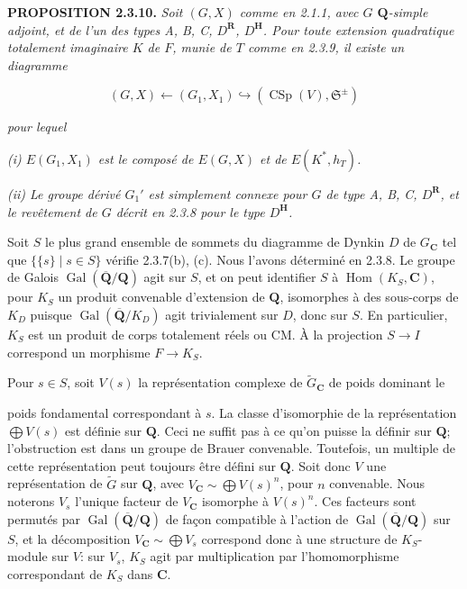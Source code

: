 \documentclass[10pt,a4paper]{article}
\newcommand{\SourcePage}[2]{\clearpage\setcounter{page}{#2}\typeout{D031_SOURCE_PAGE physical=#1 printed=#2}}
\begin{document}
\textbf{PROPOSITION 2.3.10.} \emph{Soit \((G,X)\) comme en 2.1.1, avec \(G\) \(\mathbf Q\)-simple adjoint, et de l'un des types A, B, C, \(D^{\mathbf R}\), \(D^{\mathbf H}\). Pour toute extension quadratique totalement imaginaire \(K\) de \(F\), munie de \(T\) comme en 2.3.9, il existe un diagramme}

\[
(G,X)\longleftarrow(G_1,X_1)\hookrightarrow(\operatorname{CSp}(V),\mathfrak S^{\pm})
\]

\emph{pour lequel}

\emph{(i) \(E(G_1,X_1)\) est le composé de \(E(G,X)\) et de \(E(K^*,h_T)\).}

\emph{(ii) Le groupe dérivé \(G_1'\) est simplement connexe pour \(G\) de type A, B, C, \(D^{\mathbf R}\), et le revêtement de \(G\) décrit en 2.3.8 pour le type \(D^{\mathbf H}\).}

Soit \(S\) le plus grand ensemble de sommets du diagramme de Dynkin \(D\) de \(G_{\mathbf C}\) tel que \(\{\{s\}\mid s\in S\}\) vérifie 2.3.7(b), (c). Nous l'avons déterminé en 2.3.8. Le groupe de Galois \(\operatorname{Gal}(\overline{\mathbf Q}/\mathbf Q)\) agit sur \(S\), et on peut identifier \(S\) à \(\operatorname{Hom}(K_S,\mathbf C)\), pour \(K_S\) un produit convenable d'extension de \(\mathbf Q\), isomorphes à des sous-corps de \(K_D\) puisque \(\operatorname{Gal}(\overline{\mathbf Q}/K_D)\) agit trivialement sur \(D\), donc sur \(S\). En particulier, \(K_S\) est un produit de corps totalement réels ou CM. À la projection \(S\to I\) correspond un morphisme \(F\to K_S\).

Pour \(s\in S\), soit \(V(s)\) la représentation complexe de \(\widetilde G_{\mathbf C}\) de poids dominant le

\SourcePage{27}{273}
poids fondamental correspondant à \(s\). La classe d'isomorphie de la représentation \(\bigoplus V(s)\) est définie sur \(\mathbf Q\). Ceci ne suffit pas à ce qu'on puisse la définir sur \(\mathbf Q\); l'obstruction est dans un groupe de Brauer convenable. Toutefois, un multiple de cette représentation peut toujours être défini sur \(\mathbf Q\). Soit donc \(V\) une représentation de \(\widetilde G\) sur \(\mathbf Q\), avec \(V_{\mathbf C}\sim\bigoplus V(s)^n\), pour \(n\) convenable. Nous noterons \(V_s\) l'unique facteur de \(V_{\mathbf C}\) isomorphe à \(V(s)^n\). Ces facteurs sont permutés par \(\operatorname{Gal}(\overline{\mathbf Q}/\mathbf Q)\) de façon compatible à l'action de \(\operatorname{Gal}(\overline{\mathbf Q}/\mathbf Q)\) sur \(S\), et la décomposition \(V_{\mathbf C}\sim\bigoplus V_s\) correspond donc à une structure de \(K_S\)-module sur \(V\): sur \(V_s\), \(K_S\) agit par multiplication par l'homomorphisme correspondant de \(K_S\) dans \(\mathbf C\).
\end{document}
